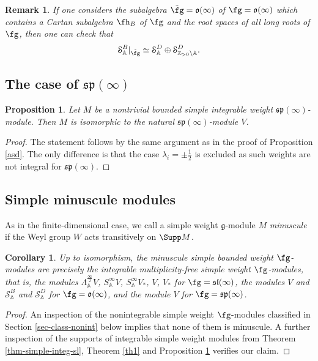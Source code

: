 \documentclass[12pt]{amsart}
\newtheorem{prop}[thm]{Proposition}
\newtheorem{cor}[thm]{Corollary}
\newtheorem{rmk}[thm]{Remark}
\begin{document}
\begin{rmk}If one considers the subalgebra $\tilde\fg=\mathfrak{o}(\infty)$ of $\fg=\mathfrak{o}(\infty)$  which contains a Cartan subalgebra $\fh_B$ of $\fg$ and the root spaces of all long roots of $\fg$, then one can check that
$$
{\mathcal S}_{\mathbb A}^B |_{\tilde \fg} \simeq  {\mathcal S}_{\mathbb A}^D \oplus {\mathcal S}_{{\mathbb Z}_{>0} \setminus \mathbb A}^D.
$$ 
\end{rmk}

\subsection{The case of $\mathfrak{sp} (\infty)$}

\begin{prop} \label{pro2}
Let $M$ be a nontrivial bounded simple integrable  weight $\mathfrak{sp}(\infty)$-module. Then $M$ is isomorphic to the natural $\mathfrak{sp}(\infty)$-module $V$.
\end{prop}

\begin{proof}
The statement follows by the same argument as in the proof of Proposition \ref{asd}. The only difference is that the case  $\lambda_i=\pm \frac{1}{2}$ is excluded
as such weights are not integral for $\mathfrak{sp}(\infty)$.
\end{proof}
\subsection{Simple minuscule modules}

 As in the finite-dimensional case, we call a  simple weight $\mathfrak{g}$-module $M$ \emph{minuscule} if the Weyl group $W$ acts transitively on $\Supp M$.

\begin{cor} Up to isomorphism, the minuscule simple bounded weight $\fg$-modules are precisely the integrable multiplicity-free simple weight $\fg$-modules, that is, the modules $\Lambda_{\mathbb A}^{\frac{\infty}{2}}V$, $S_{\mathbb A}^{\infty} V$, $S_{\mathbb A}^{\infty} V_*$, $V$, $V_*$ for $\fg=\mathfrak{sl}(\infty)$, the modules $V$ and $\mathcal S_{\mathbb A}^B$ and $\mathcal S_{\mathbb A}^D$ for $\fg=\mathfrak{o}(\infty)$, and the module $V$ for $\fg=\mathfrak{sp}(\infty)$.
\end{cor}

\begin{proof}An inspection of the nonintegrable simple weight $\fg$-modules classified in Section \ref{sec-class-nonint} below implies that  none of them is minuscule. A further inspection of the supports of integrable simple weight modules from Theorem \ref{thm-simple-integ-sl}, Theorem \ref{th1}  and Proposition \ref{pro2}   verifies our claim.
\end{proof}
\end{document}
